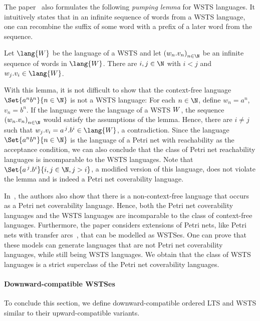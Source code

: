 \documentclass[../../diss.tex]{subfiles}
\begin{document}
The paper~\cite{GeeraertsRV07} also formulates the following \emph{pumping lemma} for WSTS languages.
It intuitively states that in an infinite sequence of words from a WSTS language, one can recombine the suffix of some word with a prefix of a later word from the sequence.

\begin{lemma}
    Let $\lang{\wsts}$ be the language of a WSTS and let ${(w_n.v_n)}_{n \in \N}$ be an infinite sequence of words in $\lang{\wsts}$.
    There are $i, j \in \N$ with $i < j$ and $w_j.v_i \in \lang{\wsts}$.
\end{lemma}

With this lemma, it is not difficult to show that the context-free language $\Set{a^n b^n}{n \in \N}$ is not a WSTS language:
For each $n \in \N$, define $w_n = a^n$, $v_n = b^n$.
If the language were the language of a WSTS $W$, the sequence ${(w_n.v_n)}_{n \in \N}$ would satisfy the assumptions of the lemma.
Hence, there are $i \neq j$ such that $w_j.v_i = a^{\,j}.b^i \in \lang{\wsts}$, a contradiction.
Since the language $\Set{a^n b^n}{n \in \N}$ is the language of a Petri net with reachability as the acceptance condition, we can also conclude that the class of Petri net reachability languages is incomparable to the WSTS languages.
Note that $\Set{ a^{\,j}.b^i }{i,j \in \N, j > i}$, a modified version of this language, does not violate the lemma and is indeed a Petri net coverability language.

In~\cite{GeeraertsRV07}, the authors also show that there is a non-context-free language that occurs as a Petri net coverability language.
Hence, both the Petri net coverability languages and the WSTS languages are incomparable to the class of context-free languages.
Furthermore, the paper considers extensions of Petri nets, like Petri nets with transfer arcs~\cite{DufourdFS98}, that can be modelled as WSTSes.
One can prove that these models can generate languages that are not Petri net coverability languages, while still being WSTS languages.
We obtain that the class of WSTS languages is a strict superclass of the Petri net coverability languages.

\paragraph{Downward-compatible WSTSes}

To conclude this section, we define downward-compatible ordered LTS and WSTS similar to their upward-compatible variants.
\end{document}

